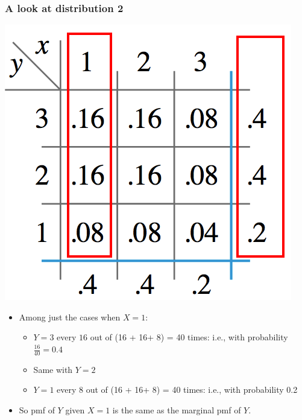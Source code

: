 \documentclass[handout]{beamer}\usepackage{graphicx, color}
\numberwithin{equation}{section}
\begin{document}
\begin{frame}
\frametitle{A look at distribution 2}
\begin{center}
 \includegraphics{../../fig/d2.png}
\end{center}
\begin{itemize}
\pause \item Among just the cases when $X = 1$:
\begin{itemize}
\pause \item $Y = 3$ every $16$ out of (16 + 16+ 8) = 40 times: i.e., with probability $\frac{16}{40} = 0.4$ 
\pause \item Same with $Y = 2$
\pause \item $Y = 1$ every $8$ out of (16 + 16+ 8) = 40 times: i.e., with probability 0.2
\end{itemize}
\pause \item So pmf of $Y$ given $X = 1$ is the same as the marginal pmf of $Y$.
\end{itemize}
\end{frame}
\end{document}
